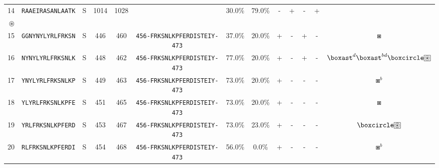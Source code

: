 \begin{tabular}{rcccccccccccc}
14 &  \texttt{RAAEIRASANLAATK} &       S &   1014 &  1028 &                                                                  &                          30.0\% &                           79.0\% &          - &           + &          - &           + &                                 \Centerstack{  $\circ \circ^b \circ^d \circ^{bd}$ \\  $\circledast$ } \\
15 &  \texttt{GGNYNYLYRLFRKSN} &       S &    446 &   460 &  \texttt{{\scriptsize 456-}FRKSNLKPFERDISTEIY{\scriptsize -473}} &                          37.0\% &                           20.0\% &          + &           - &          + &           - &                                                                                           $ \boxast $ \\
16 &  \texttt{NYNYLYRLFRKSNLK} &       S &    448 &   462 &  \texttt{{\scriptsize 456-}FRKSNLKPFERDISTEIY{\scriptsize -473}} &                          77.0\% &                           20.0\% &          + &           - &          + &           - &                 $ \boxast^d \boxast^{bd} \boxcircle \setlength{\fboxsep}{0.5pt} \boxed{\circledast} $ \\
17 &  \texttt{YNYLYRLFRKSNLKP} &       S &    449 &   463 &  \texttt{{\scriptsize 456-}FRKSNLKPFERDISTEIY{\scriptsize -473}} &                          73.0\% &                           20.0\% &          + &           - &          - &           - &                                                                                         $ \boxast^b $ \\
18 &  \texttt{YLYRLFRKSNLKPFE} &       S &    451 &   465 &  \texttt{{\scriptsize 456-}FRKSNLKPFERDISTEIY{\scriptsize -473}} &                          73.0\% &                           20.0\% &          + &           - &          - &           - &                                                                                           $ \boxast $ \\
19 &  \texttt{YRLFRKSNLKPFERD} &       S &    453 &   467 &  \texttt{{\scriptsize 456-}FRKSNLKPFERDISTEIY{\scriptsize -473}} &                          73.0\% &                           23.0\% &          + &           - &          - &           - &                                        $ \boxcircle \setlength{\fboxsep}{0.5pt} \boxed{\circledast} $ \\
20 &  \texttt{RLFRKSNLKPFERDI} &       S &    454 &   468 &  \texttt{{\scriptsize 456-}FRKSNLKPFERDISTEIY{\scriptsize -473}} &                          56.0\% &                            0.0\% &          + &           - &          - &           - &                                                                                         $ \boxast^b $ \\

\end{tabular}
